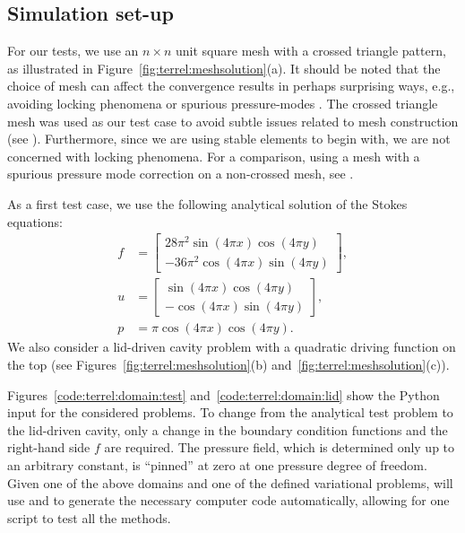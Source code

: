 \subsection{Simulation set-up}

For our tests, we use an $n \times n$ unit square mesh with a crossed
triangle pattern, as illustrated in
Figure~\ref{fig:terrel:meshsolution}(a). It should be noted that the
choice of mesh can affect the convergence results in perhaps
surprising ways, e.g., avoiding locking
phenomena \citep{NagtegaalDeJong1974} or spurious
pressure-modes \citep{Malkus2000}. The crossed triangle mesh was used
as our test case to avoid subtle issues related to mesh construction
(see \citet[Proposition~6.1]{BrezziFortin1991}). Furthermore, since we
are using stable elements to begin with, we are not concerned with
locking phenomena. For a comparison, using a mesh with a spurious
pressure mode correction on a non-crossed mesh, see
\citet{TerrelScott2008}.

As a first test case, we use the following analytical solution of the
Stokes equations:
%
\begin{align}
\label{eqn:terrel:testcase}
  f &=
    \begin{bmatrix}
      28\pi^2\sin(4\pi x)\cos(4\pi y)
      \\
      -36\pi^2\cos(4\pi x)\sin(4\pi y)
    \end{bmatrix},
\\
  u &=
  \begin{bmatrix}
    \sin(4\pi x)\cos(4\pi y)
      \\
     -\cos(4\pi x)\sin(4\pi y)
   \end{bmatrix},
\\
  p &= \pi\cos(4\pi x)\cos(4\pi y).
\end{align}
%
We also consider a lid-driven cavity problem with a quadratic driving
function on the top (see Figures~\ref{fig:terrel:meshsolution}(b)
and~\ref{fig:terrel:meshsolution}(c)).

Figures~\ref{code:terrel:domain:test} and~\ref{code:terrel:domain:lid}
show the \dolfin{} Python input for the considered problems. To change
from the analytical test problem to the lid-driven cavity, only a
change in the boundary condition functions and the right-hand side
$f$ are required.  The pressure field, which is determined only up to
an arbitrary constant, is ``pinned'' at zero at one pressure degree
of freedom.  Given one of the above domains and one of the defined
variational problems, \dolfin{} will use \ffc{} and \fiat{} to generate
the necessary computer code automatically, allowing for one script to
test all the methods.

